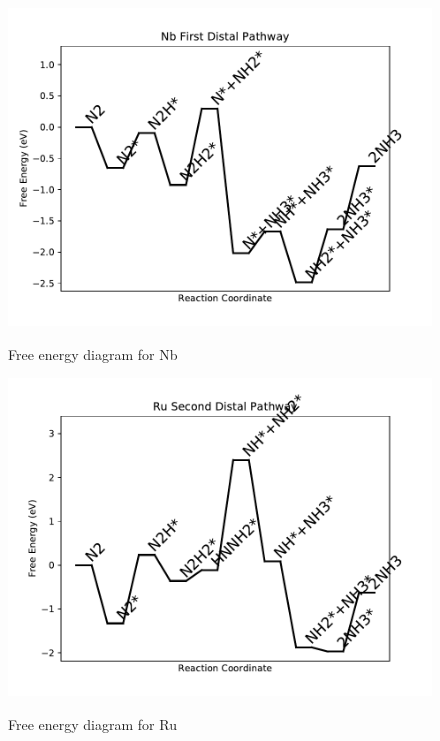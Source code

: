\documentclass[journal=jacsat,manuscript=article]{achemso}
\begin{document}
\begin{figure}
\includegraphics[width=1\linewidth]{data/plots/Nb_distal_1.pdf}
\label{fig:Nb_distal_1}
\caption{Free energy diagram for Nb}
\end{figure}

\newpage
\begin{figure}
\includegraphics[width=1\linewidth]{data/plots/Ru_distal_2.pdf}
\label{fig:Ru_distal_2}
\caption{Free energy diagram for Ru}
\end{figure}
\end{document}
